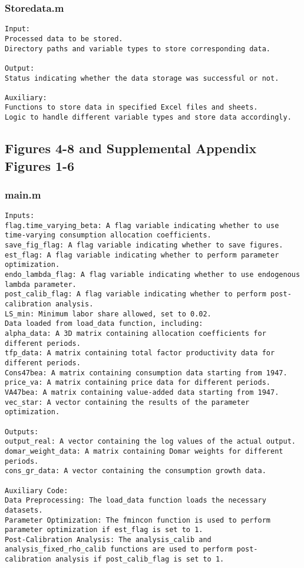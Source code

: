 \documentclass[11pt]{article}
\theoremstyle{definition}
\newcommand{\codepath}{F:/12004835/replication_package_final/replication_package_final}
\begin{document}
	\subsubsection{Storedata.m}
	\begin{lstlisting}[style=Matlab]
Input:
Processed data to be stored.
Directory paths and variable types to store corresponding data.

Output:
Status indicating whether the data storage was successful or not.

Auxiliary:
Functions to store data in specified Excel files and sheets.
Logic to handle different variable types and store data accordingly.
	\end{lstlisting}
	
	
	
	\subsection{Figures 4-8 and Supplemental Appendix Figures 1-6}
	\subsubsection{main.m}
	\begin{lstlisting}[style=Matlab]
Inputs:
flag.time_varying_beta: A flag variable indicating whether to use time-varying consumption allocation coefficients.
save_fig_flag: A flag variable indicating whether to save figures.
est_flag: A flag variable indicating whether to perform parameter optimization.
endo_lambda_flag: A flag variable indicating whether to use endogenous lambda parameter.
post_calib_flag: A flag variable indicating whether to perform post-calibration analysis.
LS_min: Minimum labor share allowed, set to 0.02.
Data loaded from load_data function, including:
alpha_data: A 3D matrix containing allocation coefficients for different periods.
tfp_data: A matrix containing total factor productivity data for different periods.
Cons47bea: A matrix containing consumption data starting from 1947.
price_va: A matrix containing price data for different periods.
VA47bea: A matrix containing value-added data starting from 1947.
vec_star: A vector containing the results of the parameter optimization.

Outputs:
output_real: A vector containing the log values of the actual output.
domar_weight_data: A matrix containing Domar weights for different periods.
cons_gr_data: A vector containing the consumption growth data.

Auxiliary Code:
Data Preprocessing: The load_data function loads the necessary datasets.
Parameter Optimization: The fmincon function is used to perform parameter optimization if est_flag is set to 1.
Post-Calibration Analysis: The analysis_calib and analysis_fixed_rho_calib functions are used to perform post-calibration analysis if post_calib_flag is set to 1.
	\end{lstlisting}
	
	
\end{document}
